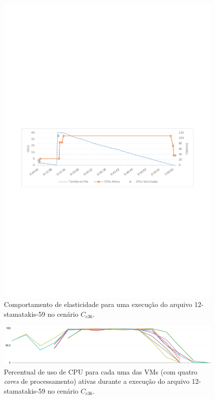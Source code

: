 \documentclass[english,brazilian]{UNISINOSmonografia} %
\begin{document}
\begin{figure}[p]
	\centering%
	\begin{minipage}{\textwidth}
		\caption{Comportamento de elasticidade para uma execução do arquivo 12-stamatakis-59 no cenário $C_{c36}$.}
		\label{fig:results-modelo-batch-stamatakis}
		\vspace{1ex}
		\includegraphics[trim=60 325 60 360,clip,width=\textwidth]{stamatakis_36cpu}
	\end{minipage}
\end{figure}
\begin{figure}[p]
	\centering%
	\begin{minipage}{\textwidth}
		\caption{Percentual de uso de CPU para cada uma das VMs (com quatro \textit{cores} de processamento) ativas durante a execução do arquivo 12-stamatakis-59 no cenário $C_{c36}$.}
		\label{fig:results-modelo-batch-stamatakis-detail}
		\vspace{1ex}
		\includegraphics[width=\textwidth]{stamatakis_36cpu_processors}
	\end{minipage}
\end{figure}
\end{document}
